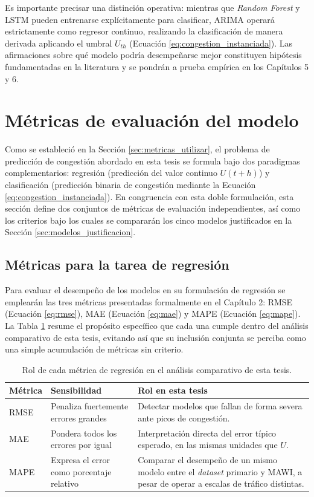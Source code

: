 \documentclass[12pt]{report}
\begin{document}
Es importante precisar una distinción operativa: mientras que \textit{Random Forest} y LSTM pueden entrenarse explícitamente para clasificar, ARIMA operará estrictamente como regresor continuo, realizando la clasificación de manera derivada aplicando el umbral $U_{th}$ (Ecuación \ref{eq:congestion_instanciada}). Las afirmaciones sobre qué modelo podría desempeñarse mejor constituyen hipótesis fundamentadas en la literatura y se pondrán a prueba empírica en los Capítulos 5 y 6.

\section{Métricas de evaluación del modelo}
\label{sec:evaluacion}

Como se estableció en la Sección \ref{sec:metricas_utilizar}, el problema de predicción de congestión abordado en esta tesis se formula bajo dos paradigmas complementarios: regresión (predicción del valor continuo $U(t+h)$) y clasificación (predicción binaria de congestión mediante la Ecuación \ref{eq:congestion_instanciada}). En congruencia con esta doble formulación, esta sección define dos conjuntos de métricas de evaluación independientes, así como los criterios bajo los cuales se compararán los cinco modelos justificados en la Sección \ref{sec:modelos_justificacion}.

\subsection*{Métricas para la tarea de regresión}

Para evaluar el desempeño de los modelos en su formulación de regresión se emplearán las tres métricas presentadas formalmente en el Capítulo 2: RMSE (Ecuación \ref{eq:rmse}), MAE (Ecuación \ref{eq:mae}) y MAPE (Ecuación \ref{eq:mape}). La Tabla \ref{tab:criterio_regresion} resume el propósito específico que cada una cumple dentro del análisis comparativo de esta tesis, evitando así que su inclusión conjunta se perciba como una simple acumulación de métricas sin criterio.

\begin{table}[H]
    \centering
    \begin{tabular}{|l|p{4.2cm}|p{4.6cm}|}
        \hline
        \textbf{Métrica} & \textbf{Sensibilidad} & \textbf{Rol en esta tesis} \\
        \hline
        RMSE & Penaliza fuertemente errores grandes & Detectar modelos que fallan de forma severa ante picos de congestión. \\
        \hline
        MAE & Pondera todos los errores por igual & Interpretación directa del error típico esperado, en las mismas unidades que $U$. \\
        \hline
        MAPE & Expresa el error como porcentaje relativo & Comparar el desempeño de un mismo modelo entre el \textit{dataset} primario y MAWI, a pesar de operar a escalas de tráfico distintas. \\
        \hline
    \end{tabular}
    \caption{Rol de cada métrica de regresión en el análisis comparativo de esta tesis.}
    \label{tab:criterio_regresion}
\end{table}
\end{document}
